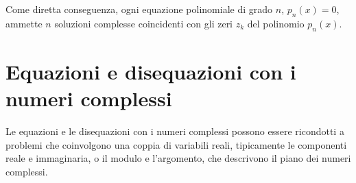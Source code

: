 \documentclass[letterpaper,10pt,italian]{jupyterBook}
\begin{document}
\sphinxAtStartPar
Come diretta conseguenza, ogni equazione polinomiale di grado \(n\), \(p_n(x) = 0\), ammette \(n\) soluzioni complesse coincidenti con gli zeri \(z_k\) del polinomio \(p_n(x)\).


\section{Equazioni e disequazioni con i numeri complessi}
\label{\detokenize{ch/algebra/complex-algebra:equazioni-e-disequazioni-con-i-numeri-complessi}}
\sphinxAtStartPar
Le equazioni e le disequazioni con i numeri complessi possono essere ricondotti a problemi che coinvolgono una coppia di variabili reali, tipicamente le componenti reale e immaginaria, o il modulo e l’argomento, che descrivono il piano dei numeri complessi.

\sphinxAtStartPar
{}

\sphinxstepscope
\end{document}

